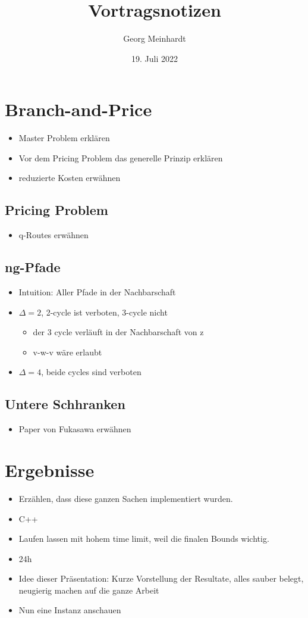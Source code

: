 \documentclass{article}
\title{Vortragsnotizen}
\author{Georg Meinhardt}
\date{19. Juli 2022}
\begin{document}
\maketitle
\section*{Branch-and-Price}
\begin{itemize}
    \item Master Problem erklären
    \item Vor dem Pricing Problem das generelle Prinzip erklären
    \item reduzierte Kosten erwähnen
\end{itemize}

\subsection*{Pricing Problem}
\begin{itemize}
    \item q-Routes erwähnen
\end{itemize}

\subsection*{ng-Pfade}
\begin{itemize}
    \item Intuition: Aller Pfade in der Nachbarschaft
    \item $\Delta = 2$, 2-cycle ist verboten, 3-cycle nicht
    \begin{itemize}
        \item der 3 cycle verläuft in der Nachbarschaft von z
        \item v-w-v wäre erlaubt
    \end{itemize}
    \item $\Delta = 4$, beide cycles sind verboten
\end{itemize}
\subsection*{Untere Schhranken}
\begin{itemize}
        \item Paper von Fukasawa erwähnen
\end{itemize}

\section*{Ergebnisse}
\begin{itemize}
    \item Erzählen, dass diese ganzen Sachen implementiert wurden.
    \item C++
    \item Laufen lassen mit hohem time limit, weil die finalen Bounds wichtig.
    \item 24h
    \item Idee dieser Präsentation: Kurze Vorstellung der Resultate, alles sauber belegt, neugierig machen auf die ganze Arbeit
    \item Nun eine Instanz anschauen
\end{itemize}
\end{document}
